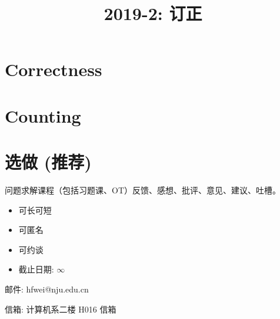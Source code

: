 \documentclass[a4paper, justified]{tufte-handout}
\title{2019-2: 订正}
\date{\zhtoday} %
\begin{document}
\maketitle
\noplagiarism %
\begin{abstract}
\end{abstract}

\section{Correctness}

\begin{problem}[DH Problem 5.8]
\end{problem}

\begin{solution}
\end{solution}

\setcounter{section}{2} %
\section{Counting}

\setcounter{problem}{2} %
\begin{problem}[CS 1.2-6]
\end{problem}

\begin{solution}
\end{solution}

\section*{选做 (推荐)}

问题求解课程（包括习题课、OT）反馈、感想、批评、意见、建议、吐槽。

\begin{itemize}
  \item 可长可短
  \item 可匿名 
  \item 可约谈
  \item 截止日期: $\infty$
\end{itemize}

邮件: hfwei@nju.edu.cn

信箱: 计算机系二楼 H016 信箱
\end{document}

